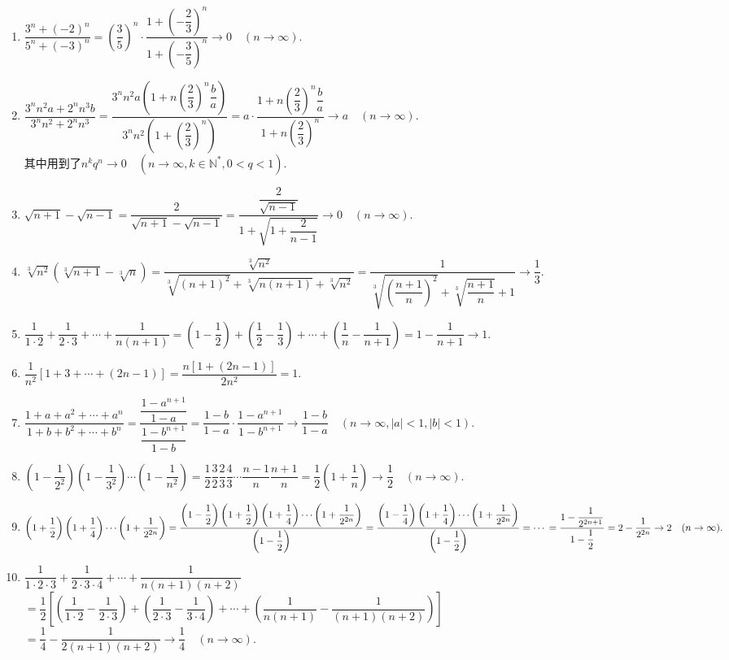 \documentclass[UTF8,a4paper,20pt]{article}
\begin{document}
\begin{enumerate}
\begin{enumerate}[(1)]
	\item $\dfrac{3^n+(-2)^n}{5^n+(-3)^n}=\left(\dfrac{3}{5}\right)^n\cdot\dfrac{1+\left(-\dfrac{2}{3}\right)^n}{1+\left(-\dfrac{3}{5}\right)^n}\to 0\quad(n\to\infty).$
	\item $\dfrac{3^nn^2a+2^nn^3b}{3^nn^2+2^nn^3}=\dfrac{3^nn^2a\left(1+n\left(\dfrac{2}{3}\right)^n\dfrac{b}{a}\right)}{3^nn^2\left(1+\left(\dfrac{2}{3}\right)^n\right)}=a\cdot\dfrac{1+n\left(\dfrac{2}{3}\right)^n\dfrac{b}{a}}{1+n\left(\dfrac{2}{3}\right)^n}\to a\quad(n\to\infty).$\\
其中用到了$n^kq^n\to 0\quad(n\to \infty, k\in\mathbb{N}^{*},0<q<1)$.
	\item $\sqrt{n+1}-\sqrt{n-1}=\dfrac{2}{\sqrt{n+1}-\sqrt{n-1}}=\dfrac{\dfrac{2}{\sqrt{n-1}}}{1+\sqrt{1+\dfrac{2}{n-1}}}\to 0 \quad(n\to\infty).$
	\item $\sqrt[3]{n^2}(\sqrt[3]{n+1}-\sqrt[3]{n})=\dfrac{\sqrt[3]{n^2}}{\sqrt[3]{(n+1)^2}+\sqrt[3]{n(n+1)}+\sqrt[3]{n^2}}=\dfrac{1}{\sqrt[3]{\left(\dfrac{n+1}{n}\right)^2}+\sqrt[3]{\dfrac{n+1}{n}}+1}\to \dfrac{1}{3}$.
	\item $\dfrac{1}{1\cdot 2}+\dfrac{1}{2\cdot 3}+\cdots+\dfrac{1}{n(n+1)}=\left(1-\dfrac{1}{2}\right)+\left(\dfrac{1}{2}-\dfrac{1}{3}\right)+\cdots+\left(\dfrac{1}{n}-\dfrac{1}{n+1}\right)=1-\dfrac{1}{n+1}\to 1$.
	\item $\dfrac{1}{n^2}[1+3+\cdots+(2n-1)]=\dfrac{n[1+(2n-1)]}{2n^2}=1.$
	\item $\dfrac{1+a+a^2+\cdots+a^n}{1+b+b^2+\cdots+b^n}=\dfrac{\dfrac{1-a^{n+1}}{1-a}}{\dfrac{1-b^{n+1}}{1-b}}=\dfrac{1-b}{1-a}\cdot\dfrac{1-a^{n+1}}{1-b^{n+1}}\to\dfrac{1-b}{1-a}\quad(n\to\infty, |a|<1, |b|<1).$
	\item $\left(1-\dfrac{1}{2^2}\right)\left(1-\dfrac{1}{3^2}\right)\cdots\left(1-\dfrac{1}{n^2}\right)=\dfrac{1}{2}\dfrac{3}{2}\dfrac{2}{3}\dfrac{4}{3}\cdots\dfrac{n-1}{n}\dfrac{n+1}{n}=\dfrac{1}{2}\left(1+\dfrac{1}{n}\right)\to \dfrac{1}{2}\quad(n\to\infty).$
	\item 
$\left(1+\dfrac{1}{2}\right)\left(1+\dfrac{1}{4}\right)\cdots\left(1+\dfrac{1}{2^{2n}}\right)=\dfrac{\left(1-\dfrac{1}{2}\right)\left(1+\dfrac{1}{2}\right)\left(1+\dfrac{1}{4}\right)\cdots\left(1+\dfrac{1}{2^{2n}}\right)}{\left(1-\dfrac{1}{2}\right)}\\
	=\dfrac{\left(1-\dfrac{1}{4}\right)\left(1+\dfrac{1}{4}\right)\cdots\left(1+\dfrac{1}{2^{2n}}\right)}{\left(1-\dfrac{1}{2}\right)}\\
	=\cdots\\
	=\dfrac{1-\dfrac{1}{2^{2n+1}}}{1-\dfrac{1}{2}}=2-\dfrac{1}{2^{2n}}\to 2\quad(n\to\infty).$
	\item $\dfrac{1}{1\cdot 2\cdot 3}+\dfrac{1}{2\cdot 3\cdot 4}+\cdots+\dfrac{1}{n(n+1)(n+2)}$\\$=\dfrac{1}{2}\left[\left(\dfrac{1}{1\cdot2}-\dfrac{1}{2\cdot3}\right)+\left(\dfrac{1}{2\cdot3}-\dfrac{1}{3\cdot4}\right)+\cdots+\left(\dfrac{1}{n(n+1)}-\dfrac{1}{(n+1)(n+2)}\right)\right]$\\$=\dfrac{1}{4}-\dfrac{1}{2(n+1)(n+2)}\to\dfrac{1}{4}\quad(n\to\infty).$
	

\end{enumerate}
\end{enumerate}
\end{document}
